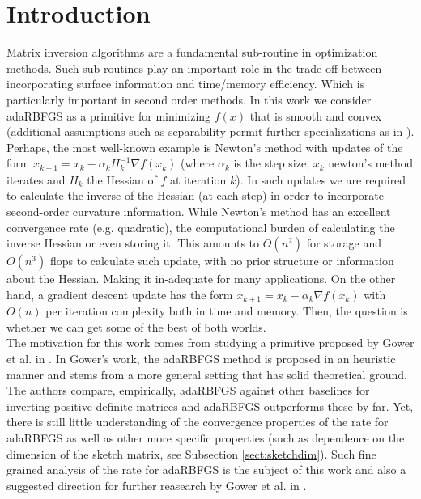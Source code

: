 \documentclass[12pt,conference,compsocconf]{IEEEtran}
\begin{document}
\section{Introduction}
Matrix inversion algorithms are a fundamental sub-routine in optimization methods. Such sub-routines play an important role in the trade-off between incorporating surface information and time/memory efficiency. Which is particularly important in second order methods. In this work we consider adaRBFGS as a primitive for minimizing $f(x)$ that is smooth and convex (additional assumptions such as separability permit further specializations as in \cite{Gower2}). Perhaps, the most well-known example is Newton's method with updates of the form $x_{k+1}=x_k-\alpha_kH_k^{-1}\nabla f(x_k)$ (where $\alpha_k$ is the step size, $x_k$ newton's method iterates and $H_k$ the Hessian of $f$ at iteration $k$). In such updates we are required to calculate the inverse of the Hessian (at each step) in order to incorporate second-order curvature information. While Newton's method has an excellent convergence rate (e.g. quadratic), the computational burden of calculating the inverse Hessian or even storing it. This amounts to $O(n^2)$ for storage and $O(n^3)$ flops to calculate such update, with no prior structure or information about the Hessian. Making it in-adequate for many applications. On the other hand, a gradient descent update has the form $x_{k+1}=x_k-\alpha_k\nabla f(x_k)$ with $O(n)$ per iteration complexity both in time and memory. Then, the question is whether we can get some of the best of both worlds.\\
The motivation for this work comes from studying a primitive proposed by Gower et al. in \cite{Gower1}. In Gower's work, the adaRBFGS method is proposed in an heuristic manner and stems from a more general setting that has solid theoretical ground. The authors compare, empirically, adaRBFGS against other baselines for inverting positive definite matrices and adaRBFGS outperforms these by far. Yet, there is still little understanding of the convergence properties of the rate for adaRBFGS as well as other more specific properties (such as dependence on the dimension of the sketch matrix, see Subsection \ref{sect:sketchdim}). Such fine grained analysis of the rate for adaRBFGS is the subject of this work and also a suggested direction for further reasearch by Gower et al. in \cite{Gower1}.
\end{document}
